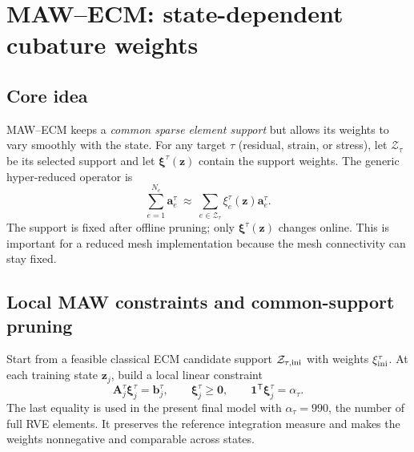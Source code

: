 \documentclass[11pt,a4paper]{article}
\newcommand{\transpose}{^{\mathsf T}}
\newcommand{\vect}[1]{\mathbf{#1}}
\newcommand{\mat}[1]{\mathbf{#1}}
\newcommand{\set}[1]{\mathcal{#1}}
\begin{document}
\section{MAW--ECM: state-dependent cubature weights}
\label{sec:maw}

\subsection{Core idea}

MAW--ECM keeps a \emph{common sparse element support} but allows its weights
to vary smoothly with the state.  For any target \(\tau\) (residual, strain,
or stress), let \(\set Z_\tau\) be its selected support and let
\(\vect\xi^\tau(\vect z)\) contain the support weights.  The generic
hyper-reduced operator is
\begin{equation}
  \sum_{e=1}^{N_e}\vect a_e^\tau
  \ \approx\
  \sum_{e\in\set Z_\tau}
    \xi_e^\tau(\vect z)\vect a_e^\tau.
  \label{eq:maw-generic}
\end{equation}
The support is fixed after offline pruning; only
\(\vect\xi^\tau(\vect z)\) changes online.  This is important for a reduced
mesh implementation because the mesh connectivity can stay fixed.

\subsection{Local MAW constraints and common-support pruning}

Start from a feasible classical ECM candidate support
\(\set Z_{\tau,\rm ini}\) with weights \(\vect\xi_{\rm ini}^\tau\).
At each training state \(\vect z_j\), build a local linear constraint
\begin{equation}
  \mat A_j^\tau\vect\xi_j^\tau=\vect b_j^\tau,
  \qquad
  \vect\xi_j^\tau\geq\vect0,
  \qquad
  \vect1\transpose\vect\xi_j^\tau=\alpha_\tau.
  \label{eq:maw-local-constraints}
\end{equation}
The last equality is used in the present final model with
\(\alpha_\tau=990\), the number of full RVE elements.  It preserves the
reference integration measure and makes the weights nonnegative and
comparable across states.
\end{document}
